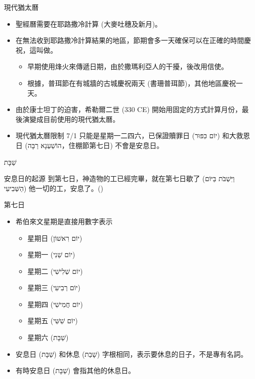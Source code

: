 \documentclass{beamer}
\newcommand{\topic}[1]{
  \begin{frame}
    \centering
    \vspace*{1cm}
    {\fontsize{40}{48}\selectfont #1\par}
    \vfill
  \end{frame}
}
\newcommand{\parvspace}{\par\vspace{0.5em}}
\begin{document}
\begin{frame}{現代猶太曆}
  \begin{itemize}
    \item 聖經曆需要在耶路撒冷計算 (大麥吐穗及新月)。
    \item 在無法收到耶路撒冷計算結果的地區，節期會多一天確保可以在正確的時間慶祝，這叫做\textcite{YomTovSheni}。
      \begin{itemize}
        \item 早期使用烽火來傳遞日期，由於撒瑪利亞人的干擾，後改用信使。\parencite{HistoryOfCalendar}
        \item 根據，普珥節在有城牆的古城慶祝兩天 (書珊普珥節)，其他地區慶祝一天。
      \end{itemize}
    \item 由於康士坦丁的迫害，希勒爾二世 (330 CE) 開始用固定的方式計算月份，最後演變成目前使用的現代猶太曆。\parencite{HistoryOfCalendar}
    \item 現代猶太曆限制 7/1 只能是星期一二四六，已保證贖罪日 (\texthebrew{יוֹם כִּפּוּר}) 和大救恩日 (\texthebrew{הוֹשַׁעְנָא רַבָּה}，住棚節第七日) 不會是安息日。\parencite{JewishCalendar}
  \end{itemize}
\end{frame}

\topic{\texthebrew{שַׁבָּת}}

\begin{frame}{安息日的起源}
  到第七日，神造物的工已經完畢，就在\alert{第七日歇了 (\texthebrew{וַיִּשְׁבֹּת בַּיּוֹם
  הַשְּׁבִיעִי})} 他一切的工，安息了。()\parvspace
\end{frame}

\begin{frame}{第七日}
  \begin{itemize}
    \item 希伯來文星期是直接用數字表示
      \begin{itemize}
        \item 星期日 (\texthebrew{יוֹם רִאשׁוֹן})
        \item 星期一 (\texthebrew{יוֹם שֵׁנִי})
        \item 星期二 (\texthebrew{יוֹם שְׁלִישִׁי})
        \item 星期三 (\texthebrew{יוֹם רְבִיעִי})
        \item 星期四 (\texthebrew{יוֹם חֲמִישִׁי})
        \item 星期五 (\texthebrew{יוֹם שִׁשִּׁי})
        \item 星期六 (\texthebrew{שַׁבָּת})
      \end{itemize}
    \item 安息日 (\texthebrew{שַׁבָּת}) 和休息 (\texthebrew{שָׁבַת})
      字根相同，表示要休息的日子，不是專有名詞。
    \item 有時安息日 (\texthebrew{שַׁבָּת}) 會指其他的休息日。
  \end{itemize}
\end{frame}
\end{document}
